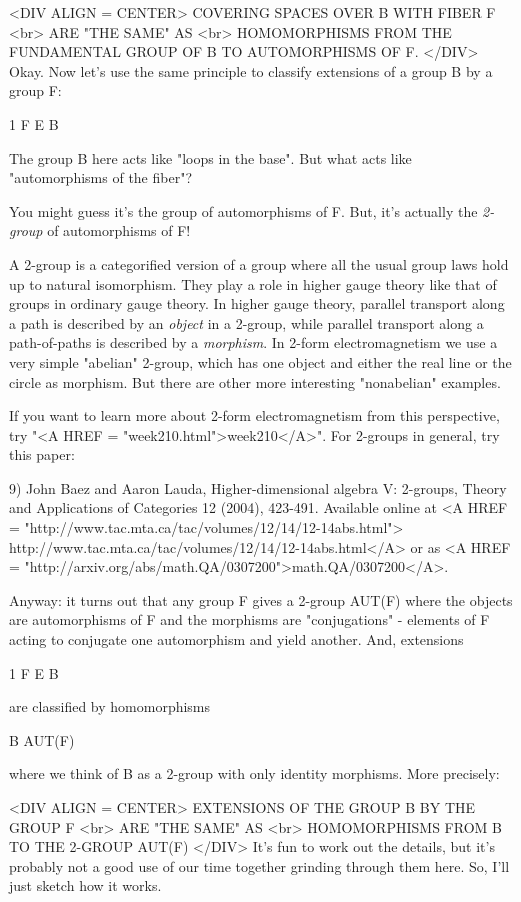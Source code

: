 <DIV ALIGN = CENTER>
                    COVERING SPACES OVER B WITH FIBER F <br>
                           ARE "THE SAME" AS <br>
    HOMOMORPHISMS FROM THE FUNDAMENTAL GROUP OF B TO AUTOMORPHISMS OF F.
</DIV>
Okay.  Now let's use the same principle to classify extensions of a group 
B by a group F:

1 \to  F \to  E \to  B 

The group B here acts like "loops in the base".  But what acts like 
"automorphisms of the fiber"?  

You might guess it's the group of automorphisms of F.  But, it's 
actually the \emph{2-group} of automorphisms of F!

A 2-group is a categorified version of a group where all the usual group
laws hold up to natural isomorphism.  They play a role in higher gauge 
theory like that of groups in ordinary gauge theory.  In higher gauge 
theory, parallel transport along a path is described by an \emph{object} in 
a 2-group, while parallel transport along a path-of-paths is described 
by a \emph{morphism}.  
In 2-form electromagnetism we use a very simple "abelian" 
2-group, which has one object and either the real line or the circle as
morphism.  But there are other more interesting "nonabelian" examples.

If you want to learn more about 2-form electromagnetism from this 
perspective, try "<A HREF = "week210.html">week210</A>".  For 2-groups in general, try this paper:

9) John Baez and Aaron Lauda, Higher-dimensional algebra V: 2-groups, 
Theory and Applications of Categories 12 (2004), 423-491. Available online at 
<A HREF = 
"http://www.tac.mta.ca/tac/volumes/12/14/12-14abs.html">
http://www.tac.mta.ca/tac/volumes/12/14/12-14abs.html</A>
or as <A HREF = "http://arxiv.org/abs/math.QA/0307200">math.QA/0307200</A>.

Anyway: it turns out that any group F gives a 2-group AUT(F) where the
objects are automorphisms of F and the morphisms are "conjugations" - 
elements of F acting to conjugate one automorphism and yield another.  
And, extensions

1 \to  F \to  E \to  B 

are classified by homomorphisms

B \to  AUT(F)

where we think of B as a 2-group with only identity morphisms.  More
precisely:

<DIV ALIGN = CENTER>
                EXTENSIONS OF THE GROUP B BY THE GROUP F <br>
                            ARE "THE SAME" AS <br>
               HOMOMORPHISMS FROM B TO THE 2-GROUP AUT(F)
</DIV>
It's fun to work out the details, but it's probably not a good use of 
our time together grinding through them here.   So, I'll just sketch
how it works.

